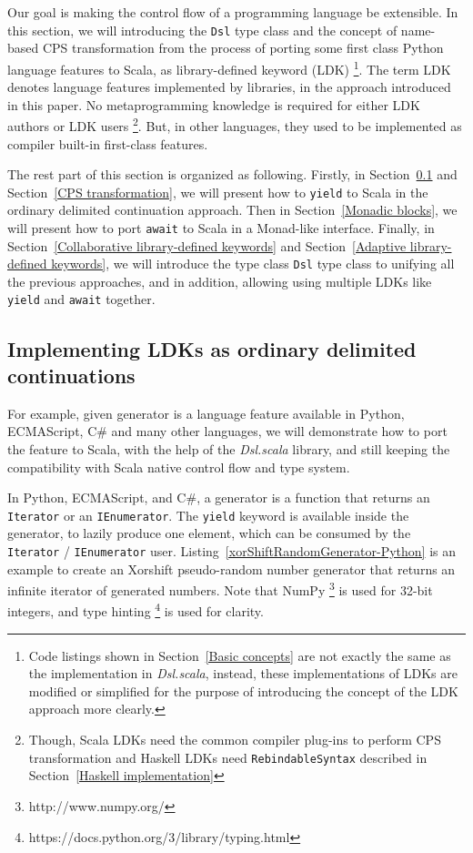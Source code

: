 Our goal is making the control flow of a programming language be extensible. In this section, we will introducing the \lstinline{Dsl} type class and the concept of name-based CPS transformation from the process of porting some first class Python language features to Scala, as library-defined keyword (LDK) \footnote{Code listings shown in Section~\ref{Basic concepts} are not exactly the same as the implementation in \textit{Dsl.scala}, instead, these implementations of LDKs are modified or simplified for the purpose of introducing the concept of the LDK approach more clearly.}. The term LDK denotes language features implemented by libraries, in the approach introduced in this paper. No metaprogramming knowledge is required for either LDK authors or LDK users \footnote{ Though, Scala LDKs need the common compiler plug-ins to perform CPS transformation and Haskell LDKs need \lstinline{RebindableSyntax} described in Section~\ref{Haskell implementation}}. But, in other languages, they used to be implemented as  compiler built-in first-class features.

The rest part of this section is organized as following. Firstly, in Section~\ref{Implementing LDKs as ordinary delimited continuations} and Section~\ref{CPS transformation}, we will present how to \lstinline{yield} to Scala in the ordinary delimited continuation approach. Then in Section~\ref{Monadic blocks}, we will present how to port \lstinline{await} to Scala in a Monad-like interface. Finally, in Section~\ref{Collaborative library-defined keywords} and Section~\ref{Adaptive library-defined keywords}, we will introduce the type class \lstinline{Dsl} type class to unifying all the previous approaches, and in addition, allowing using multiple LDKs like \lstinline{yield} and \lstinline{await} together.

\subsection{Implementing LDKs as ordinary delimited continuations}\label{Implementing LDKs as ordinary delimited continuations}

For example, given generator is a language feature available in Python, ECMAScript, C\# and many other languages, we will demonstrate how to port the feature to Scala, with the help of the \textit{Dsl.scala} library, and still keeping the compatibility with Scala native control flow and type system.

In Python, ECMAScript, and C\#, a generator is a function that returns an \lstinline{Iterator} or an \lstinline{IEnumerator}. The \lstinline{yield} keyword is available inside the generator, to lazily produce one element, which can be consumed by the \lstinline{Iterator} / \lstinline{IEnumerator} user. Listing~\ref{xorShiftRandomGenerator-Python} is an example to create an Xorshift \cite{marsaglia2003xorshift} pseudo-random number generator that returns an infinite iterator of generated numbers. Note that NumPy \footnote{http://www.numpy.org/} is used for 32-bit integers, and type hinting \footnote{https://docs.python.org/3/library/typing.html} is used for clarity.

